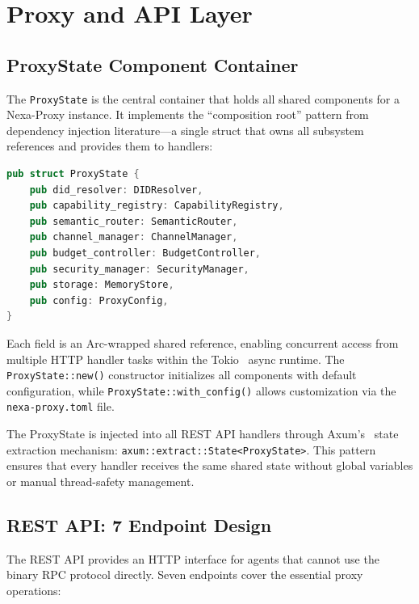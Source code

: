 \section{Proxy and API Layer}

\subsection{ProxyState Component Container}

The \texttt{ProxyState} is the central container that holds all shared components for a Nexa-Proxy instance. It implements the ``composition root'' pattern from dependency injection literature---a single struct that owns all subsystem references and provides them to handlers:

\begin{lstlisting}[language=Rust, caption={ProxyState struct definition.}]
pub struct ProxyState {
    pub did_resolver: DIDResolver,
    pub capability_registry: CapabilityRegistry,
    pub semantic_router: SemanticRouter,
    pub channel_manager: ChannelManager,
    pub budget_controller: BudgetController,
    pub security_manager: SecurityManager,
    pub storage: MemoryStore,
    pub config: ProxyConfig,
}
\end{lstlisting}

Each field is an Arc-wrapped shared reference, enabling concurrent access from multiple HTTP handler tasks within the Tokio~\cite{tokio2022} async runtime. The \texttt{ProxyState::new()} constructor initializes all components with default configuration, while \texttt{ProxyState::with\_config()} allows customization via the \texttt{nexa-proxy.toml} file.

The ProxyState is injected into all REST API handlers through Axum's~\cite{axum2022} state extraction mechanism: \texttt{axum::extract::State<ProxyState>}. This pattern ensures that every handler receives the same shared state without global variables or manual thread-safety management.

\subsection{REST API: 7 Endpoint Design}

The REST API provides an HTTP interface for agents that cannot use the binary RPC protocol directly. Seven endpoints cover the essential proxy operations:

